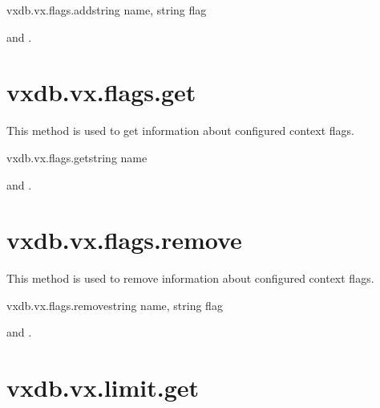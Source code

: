 \begin{rpcsynopsis}{vxdb.vx.flags.add}{string name, string flag}
\end{rpcsynopsis}

\begin{rpcaccess}
 and \rpcownerchecks.
\end{rpcaccess}

\rpcreturnnil

\rpcnoerrors


\section{vxdb.vx.flags.get}

This method is used to get information about configured context flags.

\begin{rpcsynopsis}{vxdb.vx.flags.get}{string name}
\end{rpcsynopsis}

\begin{rpcaccess}
 and \rpcownerchecks.
\end{rpcaccess}


\rpcnoerrors


\section{vxdb.vx.flags.remove}

This method is used to remove information about configured context flags.

\begin{rpcsynopsis}{vxdb.vx.flags.remove}{string name, string flag}
\end{rpcsynopsis}

\begin{rpcaccess}
 and \rpcownerchecks.
\end{rpcaccess}

\rpcreturnnil

\rpcnoerrors


\section{vxdb.vx.limit.get}


